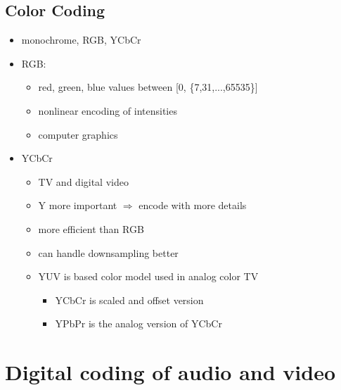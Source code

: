 \documentclass[a4paper,10pt]{scrreprt}
\begin{document}
\section{Color Coding}
\begin{itemize}
 \item monochrome, RGB, YCbCr
 \item RGB: 
 \begin{itemize}
  \item red, green, blue values between [0,  \{7,31,...,65535\}]
  \item nonlinear encoding of intensities 
  \item computer graphics
 \end{itemize}
 \item YCbCr
 \begin{itemize}
  \item TV and digital video
  \item Y more important $\Rightarrow$ encode with more details 
  \item more efficient than RGB
  \item can handle downsampling better
  \item YUV is based color model used in analog color TV
  \begin{itemize}
   \item YCbCr is scaled and offset version
   \item YPbPr is the analog version of YCbCr
  \end{itemize}
 \end{itemize}
\end{itemize}

\chapter{Digital coding of audio and video}
\end{document}
